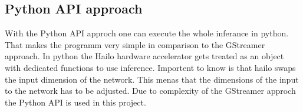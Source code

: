 \subsection{Python API approach}

With the Python API approch one can execute the whole inferance in python.
That makes the programm very simple in comparison to the GStreamer approach.
In python the Hailo hardware accelerator gets treated as an object with dedicated functions to use inference.
Importent to know is that hailo swaps the input dimension of the network.
This menas that the dimensions of the input to the network has to be adjusted.
Due to complexity of the GStreamer approch the Python API is used in this project.